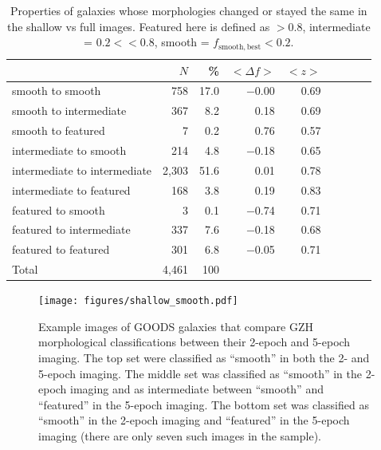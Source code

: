 \documentclass[a4paper,fleqn,usenatbib]{mnras}
\begin{document}
\begin{table}
\caption{Properties of galaxies whose morphologies changed or stayed the same
in the shallow vs full images. Featured here is defined as \fbest$>0.8$,
intermediate = $0.2<$\fbest$<0.8$, smooth = $f_\mathrm{smooth,best}<0.2$.
\label{tbl:shallow_to_full_stats}}
\begin{tabular}{lrrrrrrrr}
\hline\hline
                              & $N$     & \%       & $<\Delta f>$ & $<z>$   \\
\hline
smooth to smooth              & 758     & 17.0     & $-$0.00      &  0.69   \\
smooth to intermediate        & 367     & 8.2      &    0.18      &  0.69   \\
smooth to featured            & 7       & 0.2      &    0.76      &  0.57   \\ 
intermediate to smooth        & 214     & 4.8      & $-$0.18      &  0.65   \\
intermediate to intermediate  & 2,303   & 51.6     &    0.01      &  0.78   \\
intermediate to featured      & 168     & 3.8      &    0.19      &  0.83   \\
featured to smooth            & 3       & 0.1      & $-$0.74      &  0.71   \\
featured to intermediate      & 337     & 7.6      & $-$0.18      &  0.68   \\
featured to featured          & 301     & 6.8      & $-$0.05      &  0.71   \\
\hline
Total                         & 4,461   & 100      &              &         \\
\hline\hline
\end{tabular}
\end{table}

\begin{figure}
\centering
\texttt{[image: figures/shallow\_smooth.pdf]}
\caption{Example images of GOODS galaxies that compare GZH morphological
classifications between their 2-epoch and 5-epoch imaging.  The top set
were classified as ``smooth'' in both the 2- and 5-epoch imaging. The
middle set was classified as ``smooth'' in the 2-epoch imaging and as
intermediate between ``smooth'' and ``featured'' in the 5-epoch imaging. The
bottom set was classified as ``smooth'' in the 2-epoch imaging and
``featured'' in the 5-epoch imaging (there are only seven such images
in the sample).}
\label{fig:shallow_smooth}
\end{figure}
\end{document}
